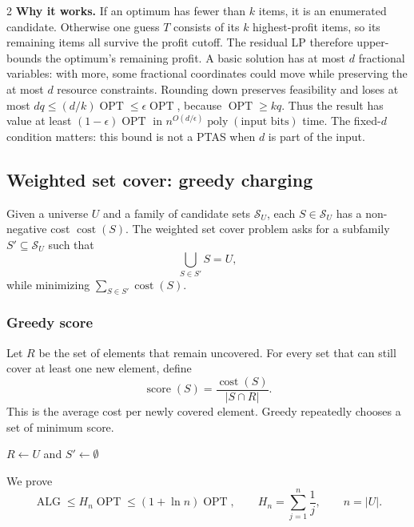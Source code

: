 \documentclass[8pt]{extarticle}
\theoremstyle{definition}
\newcommand{\OPT}{\operatorname{OPT}}
\newcommand{\ALG}{\operatorname{ALG}}
\begin{document}
\begin{multicols*}{2}
\textbf{Why it works.} If an optimum has fewer than $k$ items, it is an
enumerated candidate. Otherwise one guess $T$ consists of its $k$
highest-profit items, so its remaining items all survive the profit cutoff.
The residual LP therefore upper-bounds the optimum's remaining profit.
A basic solution has at most $d$ fractional variables: with more, some
fractional coordinates could move while preserving the at most $d$
resource constraints. Rounding down preserves feasibility and loses at
most $dq\le(d/k)\OPT\le\epsilon\OPT$, because $\OPT\ge kq$.
Thus the result has value at least $(1-\epsilon)\OPT$ in
$n^{O(d/\epsilon)}\operatorname{poly}(\text{input bits})$ time. The
fixed-$d$ condition matters: this bound is not a PTAS when $d$ is part
of the input.



\subsection{Weighted set cover: greedy charging}\label{gre:setcover}
Given a universe $U$ and a family of candidate sets $\mathcal{S}_U$, each
$S\in\mathcal{S}_U$ has a non-negative cost $\operatorname{cost}(S)$. The
weighted set cover problem asks for a subfamily $S'\subseteq\mathcal{S}_U$
such that
\[
  \bigcup_{S\in S'}S=U,
\]
while minimizing $\sum_{S\in S'}\operatorname{cost}(S)$.

\subsubsection*{Greedy score}
Let $R$ be the set of elements that remain uncovered. For every set that can
still cover at least one new element, define
\[
  \operatorname{score}(S)=
  \frac{\operatorname{cost}(S)}{|S\cap R|}.
\]
This is the average cost per newly covered element. Greedy repeatedly chooses
a set of minimum score.


\begin{algorithm}[H]
$R\gets U$ and $S'\gets\emptyset$\;
\;
\end{algorithm}

We prove
\[
  \ALG\leq H_n\OPT\leq(1+\ln n)\OPT,
  \qquad
  H_n=\sum_{j=1}^{n}\frac1j,\qquad n=|U|.
\]


\end{multicols*}
\end{document}
